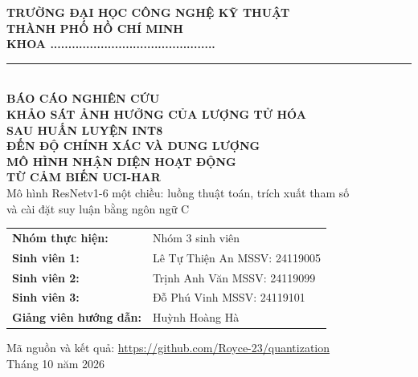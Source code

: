 \documentclass[12pt,a4paper]{article}
\begin{document}
\begin{titlepage}
\centering
\vspace*{4mm}
{\large\bfseries TRƯỜNG ĐẠI HỌC CÔNG NGHỆ KỸ THUẬT\\ THÀNH PHỐ HỒ CHÍ MINH}\\[1mm]
{\bfseries KHOA ..............................................}\\[3mm]
\rule{0.55\textwidth}{0.4pt}\\[18mm]

{\Large\bfseries BÁO CÁO NGHIÊN CỨU}\\[12mm]
{\LARGE\bfseries KHẢO SÁT ẢNH HƯỞNG CỦA LƯỢNG TỬ HÓA\\[2mm] SAU HUẤN LUYỆN INT8\\[2mm] ĐẾN ĐỘ CHÍNH XÁC VÀ DUNG LƯỢNG\\[2mm] MÔ HÌNH NHẬN DIỆN HOẠT ĐỘNG\\[2mm] TỪ CẢM BIẾN UCI-HAR}\\[10mm]
{\large Mô hình ResNetv1-6 một chiều: luồng thuật toán, trích xuất tham số\\ và cài đặt suy luận bằng ngôn ngữ C}\\[22mm]

\begin{flushleft}
\hspace{2.2cm}\begin{tabular}{@{}l l@{}}
\textbf{Nhóm thực hiện:} & Nhóm 3 sinh viên \\[2mm]
\textbf{Sinh viên 1:} & Lê Tự Thiện An \quad MSSV: 24119005 \\[1mm]
\textbf{Sinh viên 2:} & Trịnh Anh Văn \quad MSSV: 24119099 \\[1mm]
\textbf{Sinh viên 3:} & Đỗ Phú Vinh \quad MSSV: 24119101 \\[3mm]
\textbf{Giảng viên hướng dẫn:} & Huỳnh Hoàng Hà \\
\end{tabular}
\end{flushleft}

\vfill
{\large Mã nguồn và kết quả: \url{https://github.com/Royce-23/quantization}}\\[4mm]
{\large Tháng 10 năm 2026}
\end{titlepage}
\end{document}
